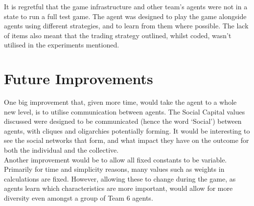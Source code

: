 It is regretful that the game infrastructure and other team's agents were not in a state to run a full test game. The agent was designed to play the game alongside agents using different strategies, and to learn from them where possible. The lack of items also meant that the trading strategy outlined, whilst coded, wasn't utilised in the experiments mentioned.

\section{Future Improvements}

One big improvement that, given more time, would take the agent to a whole new level, is to utilise communication between agents. The Social Capital values discussed were designed to be communicated (hence the word `Social') between agents, with cliques and oligarchies potentially forming. It would be interesting to see the social networks that form, and what impact they have on the outcome for both the individual and the collective.\\

Another improvement would be to allow all fixed constants to be variable. Primarily for time and simplicity reasons, many values such as weights in calculations are fixed. However, allowing these to change during the game, as agents learn which characteristics are more important, would allow for more diversity even amongst a group of Team 6 agents.
